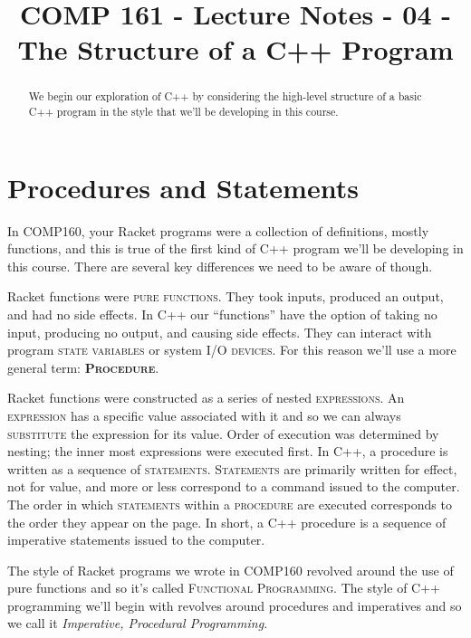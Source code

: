 \documentclass[]{tufte-handout}
\title{COMP 161 - Lecture Notes - 04 - The Structure of a C++ Program}
\begin{document}
 
\maketitle

\begin{abstract}
We begin our exploration of C++ by considering the high-level structure of a basic C++ program in the style that we'll be developing in this course.  
\end{abstract}

\section{Procedures and Statements}
In COMP160, your Racket programs were a collection of definitions, mostly functions, and this is true of the first kind of C++ program we'll be developing in this course.  There are several key differences we need to be aware of though. 

Racket functions were \textsc{pure functions}. They took inputs, produced an output, and had no side effects.  In C++ our ``functions'' have the option of taking no input, producing no output, and causing side effects.  They can interact with program \textsc{state variables} or system \textsc{I/O devices}. For this reason we'll use a more general term: \textsc{\textbf{Procedure}}. 

Racket functions were constructed as a series of nested \textsc{expressions}.  An \textsc{expression} has a specific value associated with it and so we can always \textsc{substitute} the expression for its value. Order of execution was determined by nesting; the inner most expressions were executed first.  In C++, a procedure is written as a sequence of \textsc{statements}.  \textsc{Statements} are primarily written for effect, not for value, and more or less correspond to a command issued to the computer. The order in which \textsc{statements} within a \textsc{procedure} are executed corresponds to the order they appear on the page.  In short, a C++ procedure is a sequence of imperative statements issued to the computer. 

The style of Racket programs we wrote in COMP160 revolved around the use of pure functions and so it's called  \textsc{Functional Programming}.  The style of C++ programming we'll begin with revolves around procedures and imperatives and so we call it \textit{Imperative, Procedural Programming.}
\end{document}
